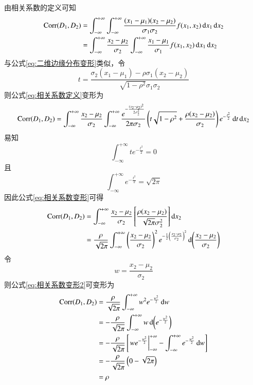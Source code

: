 由相关系数的定义可知
\begin{align}
\operatorname{Corr}(D_1,D_2) &= \int_{-\infty}^{+\infty}\int_{-\infty}^{+\infty}\frac{(x_1-\mu_1)(x_2-\mu_2)}{\sigma_1\sigma_2}f(x_1,x_2)\operatorname{d\!} x_1\operatorname{d\!} x_2 \notag\\
&= \int_{-\infty}^{+\infty}\frac{x_2-\mu_2}{\sigma_2}\int_{-\infty}^{+\infty}\frac{x_1-\mu_1}{\sigma_1}f(x_1,x_2)\operatorname{d\!} x_1\operatorname{d\!} x_2
\label{eq:相关系数定义}
\end{align}
与公式\ref{eq:二维边缘分布变形}类似，令
\[
t = \frac{\sigma_2(x_1-\mu_1)-\rho\sigma_1(x_2-\mu_2)}{\sqrt{1-\rho^2}\sigma_1\sigma_2}
\]
则公式\ref{eq:相关系数定义}变形为
\begin{equation}
\operatorname{Corr}(D_1,D_2) = \int_{-\infty}^{+\infty}\frac{x_2-\mu_2}{\sigma_2}\int_{-\infty}^{+\infty}\frac{e^{-\frac{(x_2-\mu_2)^2}{2\sigma_2^2}}}{2\pi\sigma_2}\left(t\sqrt{1-\rho^2}+\frac{\rho(x_2-\mu_2)}{\sigma_2}\right)e^{-\frac{t^2}{2}}\operatorname{d\!} t\operatorname{d\!} x_2
\label{eq:相关系数变形}
\end{equation}
易知
\[
\int_{-\infty}^{+\infty}te^{-\frac{t^2}{2}} = 0
\]
且
\[
\int_{-\infty}^{+\infty}e^{-\frac{t^2}{2}} = \sqrt{2\pi}
\]
因此公式\ref{eq:相关系数变形}可得
\begin{align}
\operatorname{Corr}(D_1,D_2) &= \int_{-\infty}^{+\infty}\frac{x_2-\mu_2}{\sigma_2}\left[\frac{\rho(x_2-\mu_2)}{\sqrt{2\pi}\sigma_2^2}\right]\operatorname{d\!} x_2 \notag\\
&= \frac{\rho}{\sqrt{2\pi}}\int_{-\infty}^{+\infty}\left(\frac{x_2-\mu_2}{\sigma_2}\right)^2e^{-\frac{1}{2}\left(\frac{x_2-\mu_2}{\sigma_2}\right)^2}\operatorname{d\!} \left(\frac{x_2-\mu_2}{\sigma_2}\right)
\label{eq:相关系数变形2}
\end{align}
令
\[
w = \frac{x_2-\mu_2}{\sigma_2}
\]
则公式\ref{eq:相关系数变形2}可变形为
\begin{align}
\operatorname{Corr}(D_1,D_2) &= \frac{\rho}{\sqrt{2\pi}}\int_{-\infty}^{+\infty}w^2e^{-\frac{w^2}{2}}\operatorname{d\!} w \notag\\
&= -\frac{\rho}{\sqrt{2\pi}}\int_{-\infty}^{+\infty}w\operatorname{d\!} \left(e^{-\frac{w^2}{2}}\right) \notag\\
&= -\frac{\rho}{\sqrt{2\pi}}\left[\left.we^{-\frac{w^2}{2}}\right|_{-\infty}^{+\infty}-\int_{-\infty}^{+\infty}e^{-\frac{w^2}{2}}\operatorname{d\!} w\right] \notag\\
&= -\frac{\rho}{\sqrt{2\pi}}\left(0-\sqrt{2\pi}\right) \notag\\
&= \rho
\label{eq:相关系数结果}
\end{align}



